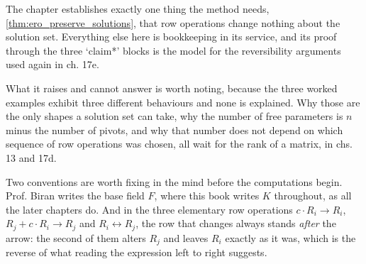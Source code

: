 \begin{ainote}
The chapter establishes exactly one thing the method needs,
\cref{thm:ero_preserve_solutions}, that row operations change nothing about the
solution set. Everything else here is bookkeeping in its service, and its proof
through the three `claim*' blocks is the model for the reversibility arguments
used again in ch. 17e.

What it raises and cannot answer is worth noting, because the three worked
examples exhibit three different behaviours and none is explained. Why those are
the only shapes a solution set can take, why the number of free parameters is $n$
minus the number of pivots, and why that number does not depend on which sequence
of row operations was chosen, all wait for the rank of a matrix, in chs. 13 and
17d.

Two conventions are worth fixing in the mind before the computations begin.
Prof. Biran writes the base field $F$, where this book writes $K$ throughout, as
all the later chapters do. And in the three elementary row operations
$c \cdot R_i \to R_i$, $R_j + c \cdot R_i \to R_j$ and
$R_i \leftrightarrow R_j$, the row that changes always stands \emph{after} the
arrow: the second of them alters $R_j$ and leaves $R_i$ exactly as it was, which
is the reverse of what reading the expression left to right suggests.
\end{ainote}


